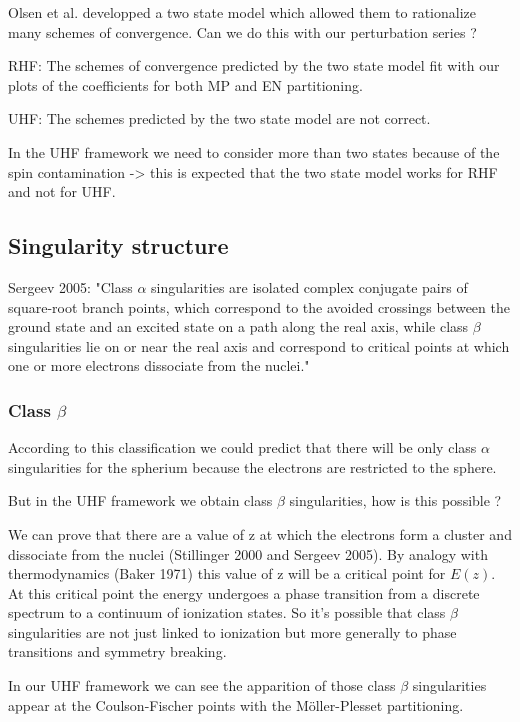 \documentclass{article}
\begin{document}
Olsen et al. developped a two state model which allowed them to rationalize many schemes of convergence. Can we do this with our perturbation series ? 

RHF: The schemes of convergence predicted by the two state model fit with our plots of the coefficients for both MP and EN partitioning.

UHF: The schemes predicted by the two state model are not correct. 

In the UHF framework we need to consider more than two states because of the spin contamination -> this is expected that the two state model works for RHF and not for UHF.

\subsection{Singularity structure}

Sergeev 2005:
"Class $\alpha$ singularities are isolated complex conjugate pairs of square-root branch points, which correspond to the avoided crossings between the ground state and an excited state on a path along the real axis, while class $\beta$ singularities lie on or near the real axis and correspond to critical points at which one or more electrons dissociate from the nuclei."

\subsubsection{Class $\beta$}

According to this classification we could predict that there will be only class $\alpha$ singularities for the spherium because the electrons are restricted to the sphere.

But in the UHF framework we obtain class $\beta$ singularities, how is this possible ?

We can prove that there are a value of z at which the electrons form a cluster and dissociate from the nuclei (Stillinger 2000 and Sergeev 2005). By analogy with thermodynamics (Baker 1971) this value of z will be a critical point for $E(z)$. At this critical point the energy undergoes a phase transition from a discrete spectrum to a continuum of ionization states. So it's possible that class $\beta$ singularities are not just linked to ionization but more generally to phase transitions and symmetry breaking.

In our UHF framework we can see the apparition of those class $\beta$ singularities appear at the Coulson-Fischer points with the Möller-Plesset partitioning.
\end{document}
